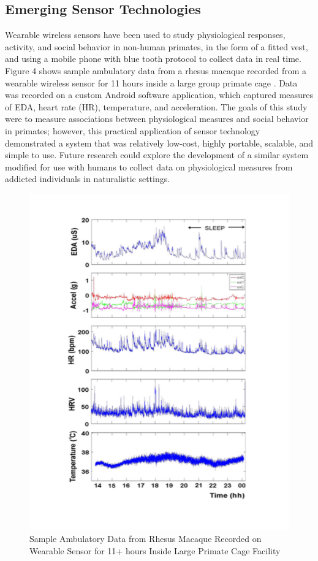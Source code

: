 \documentclass[sigconf]{acmart}
\begin{document}
\subsection{Emerging Sensor Technologies}

Wearable wireless sensors have been used to study physiological responses, 
activity, and social behavior in non-human primates, in the form of a fitted 
vest, and using a mobile phone with blue tooth protocol to collect data 
in real time. Figure 4 shows sample ambulatory data from a rhesus macaque
recorded from a wearable wireless sensor for 11 hours inside a large group 
primate cage \cite{fletcher12}. Data was recorded on a custom Android software 
application, which captured measures of EDA, heart rate (HR), temperature, and 
acceleration. The goals of this study were to measure associations between 
physiological measures and social behavior in primates; however, this practical 
application of sensor technology demonstrated a system that was relatively 
low-cost, highly portable, scalable, and simple to use. Future research could 
explore the development of a similar system modified for use with humans to 
collect data on physiological measures from addicted individuals in naturalistic 
settings. 

\begin{figure}[!ht]
  \centering\includegraphics[width=\columnwidth]{images/Figure4.pdf}
  \caption{Sample Ambulatory Data from Rhesus Macaque Recorded on 
  Wearable Sensor for 11+ hours Inside Large Primate Cage Facility 
  \cite{fletcher12}}
  \label{f:Figure4}
\end{figure}
\end{document}
